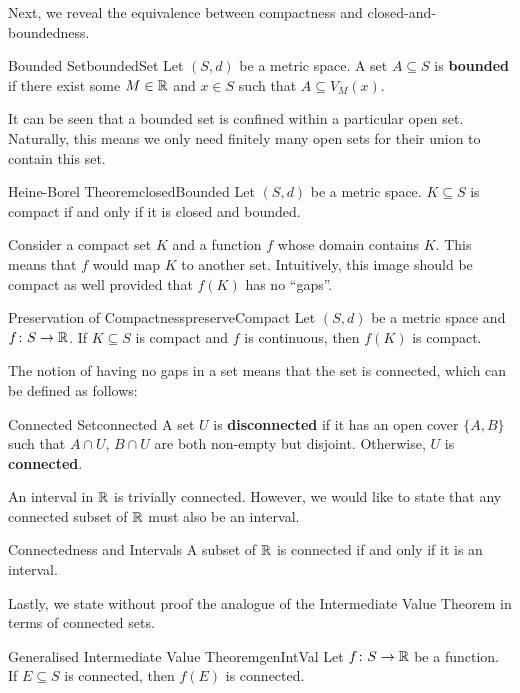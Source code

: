 \documentclass[math]{amznotes}
\theoremstyle{remark}
\begin{document}
Next, we reveal the equivalence between compactness and closed-and-boundedness.
\begin{dfnbox}{Bounded Set}{boundedSet}
    Let $(S, d)$ be a metric space. A set $A \subseteq S$ is {\color{red} \textbf{bounded}} if there exist some $M \in \mathbb{R}$ and $x \in S$ such that $A \subseteq V_M(x)$.
\end{dfnbox}
It can be seen that a bounded set is confined within a particular open set. Naturally, this means we only need finitely many open sets for their union to contain this set.
\begin{thmbox}{Heine-Borel Theorem}{closedBounded}
    Let $(S, d)$ be a metric space. $K \subseteq S$ is compact if and only if it is closed and bounded.
\end{thmbox}
Consider a compact set $K$ and a function $f$ whose domain contains $K$. This means that $f$ would map $K$ to another set. Intuitively, this image should be compact as well provided that $f(K)$ has no ``gaps''.
\begin{thmbox}{Preservation of Compactness}{preserveCompact}
    Let $(S, d)$ be a metric space and $f \colon S \to \mathbb{R}$. If $K \subseteq S$ is compact and $f$ is continuous, then $f(K)$ is compact.
\end{thmbox}
The notion of having no gaps in a set means that the set is connected, which can be defined as follows:
\begin{dfnbox}{Connected Set}{connected}
    A set $U$ is {\color{red} \textbf{disconnected}} if it has an open cover $\{A, B\}$ such that $A \cap U$, $B \cap U$ are both non-empty but disjoint. Otherwise, $U$ is {\color{red} \textbf{connected}}.
\end{dfnbox}
An interval in $\mathbb{R}$ is trivially connected. However, we would like to state that any connected subset of $\mathbb{R}$ must also be an interval.
\begin{probox}{Connectedness and Intervals}{}
    A subset of $\mathbb{R}$ is connected if and only if it is an interval.
\end{probox}
Lastly, we state without proof the analogue of the Intermediate Value Theorem in terms of connected sets.
\begin{thmbox}{Generalised Intermediate Value Theorem}{genIntVal}
    Let $f \colon S \to \mathbb{R}$ be a function. If $E \subseteq S$ is connected, then $f(E)$ is connected.
\end{thmbox}
\end{document}
